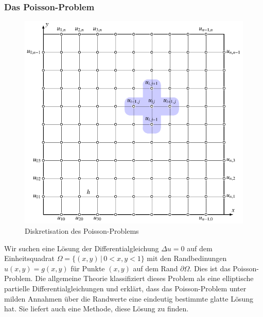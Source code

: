 \subsubsection{Das Poisson-Problem}
\begin{figure}
\centering
\includegraphics{chapters/2/poisson.pdf}
\caption{Diskretisation des Poisson-Problems
\label{skript:poisson:grid}}
\end{figure}
Wir suchen eine Lösung der Differentialgleichung
$\Delta u = 0$ auf dem Einheitsquadrat $\Omega=\{(x,y)\,|\, 0<x,y < 1\}$
mit den Randbedinungen $u(x,y)=g(x,y)$ für Punkte $(x,y)$ auf dem
Rand $\partial\Omega$.
Dies ist das Poisson-Problem.
Die allgemeine Theorie \cite{skript:pde} klassifiziert dieses Problem
als eine elliptische partielle Differentialgleichungen und erklärt,
dass das Poisson-Problem unter milden Annahmen über die Randwerte
eine eindeutig bestimmte glatte Lösung hat.
Sie liefert auch eine Methode, diese Lösung zu finden.

